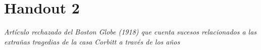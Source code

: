 \chapter{Handout 2}

\emph{Artículo rechazado del \emph{Boston Globe (1918)} que cuenta sucesos
relacionados a las extrañas tragedias de la casa Corbitt a través de los años}

